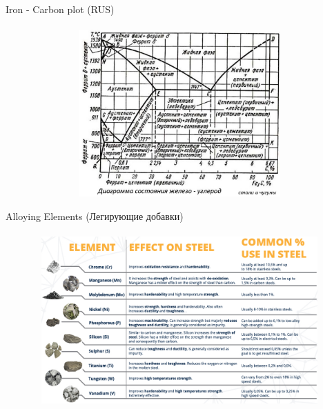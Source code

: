 \documentclass[aspectratio=169]{beamer}
\begin{document}
\begin{frame}[t]{Iron - Carbon plot (RUS)}
    \framesubtitle{}
        \vspace{-0.6cm}
        \begin{figure}[H]
            \centering\includegraphics[height=6.4cm,width=1\textwidth,keepaspectratio]{FeCplot.jpg}
            \label{fig:FeCplot.jpg}
        \end{figure}
    \end{frame}

\begin{frame}[t]{Alloying Elements (Легирующие добавки)}
\framesubtitle{}
    \vspace{-0.6cm}
    \begin{figure}[H]
        \centering\includegraphics[height=6.4cm,width=1\textwidth,keepaspectratio]{alloy_elements.png}
        \label{fig:alloy_elements.png}
    \end{figure}
\end{frame}
\end{document}
